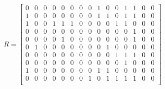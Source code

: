 
\begin{equation}
R = \begin{bmatrix}
  0 & 0 & 0 & 0 & 0 & 0 & 0 & 0 & 1 & 0 & 0 & 1 & 1 & 0 & 0 \\
  1 & 0 & 0 & 0 & 0 & 0 & 0 & 0 & 1 & 1 & 0 & 1 & 1 & 0 & 0 \\
  1 & 0 & 0 & 1 & 1 & 1 & 0 & 0 & 0 & 0 & 1 & 1 & 0 & 0 & 0 \\
  0 & 0 & 0 & 0 & 0 & 0 & 0 & 0 & 0 & 0 & 0 & 0 & 1 & 0 & 0 \\
  0 & 0 & 0 & 0 & 1 & 0 & 0 & 0 & 0 & 0 & 0 & 0 & 1 & 0 & 0 \\
  0 & 1 & 0 & 0 & 0 & 0 & 0 & 0 & 0 & 1 & 0 & 0 & 0 & 0 & 0 \\
  0 & 0 & 0 & 0 & 0 & 0 & 0 & 0 & 0 & 0 & 1 & 1 & 1 & 0 & 0 \\
  0 & 0 & 0 & 0 & 0 & 0 & 0 & 0 & 0 & 0 & 0 & 1 & 0 & 0 & 0 \\
  1 & 0 & 0 & 0 & 0 & 0 & 0 & 0 & 1 & 1 & 0 & 0 & 0 & 0 & 0 \\
  0 & 0 & 0 & 0 & 0 & 0 & 0 & 1 & 0 & 1 & 1 & 1 & 1 & 0 & 0 \\
\end{bmatrix}
\end{equation}
